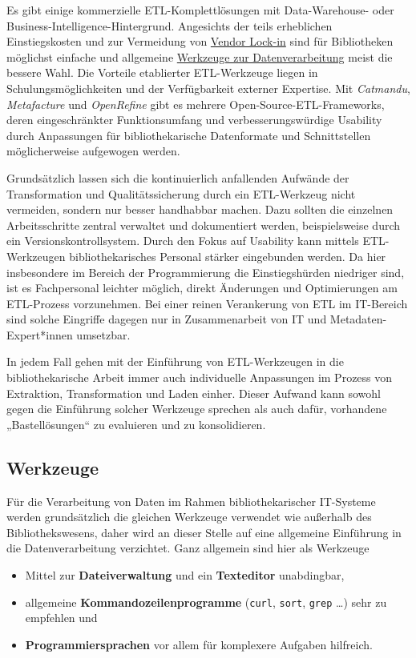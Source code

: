 \documentclass[
  11pt,
  letterpaper,
  DIV=11,
  twoside]{scrreprt}
\begin{document}
Es gibt einige kommerzielle ETL-Komplettlösungen mit Data-Warehouse-
oder Business-Intelligence-Hintergrund. Angesichts der teils erheblichen
Einstiegskosten und zur Vermeidung von \hyperref[vendor-lock-in]{Vendor
Lock-in} sind für Bibliotheken möglichst einfache und allgemeine
\hyperref[werkzeuge]{Werkzeuge zur Datenverarbeitung} meist die bessere
Wahl. Die Vorteile etablierter ETL-Werkzeuge liegen in
Schulungsmöglichkeiten und der Verfügbarkeit externer Expertise. Mit
\emph{Catmandu}, \emph{Metafacture} und \emph{OpenRefine} gibt es
mehrere Open-Source-ETL-Frameworks, deren eingeschränkter
Funktionsumfang und verbesserungswürdige Usability durch Anpassungen für
bibliothekarische Datenformate und Schnittstellen möglicherweise
aufgewogen werden.

Grundsätzlich lassen sich die kontinuierlich anfallenden Aufwände der
Transformation und Qualitätssicherung durch ein ETL-Werkzeug nicht
vermeiden, sondern nur besser handhabbar machen. Dazu sollten die
einzelnen Arbeitsschritte zentral verwaltet und dokumentiert werden,
beispielsweise durch ein Versionskontrollsystem. Durch den Fokus auf
Usability kann mittels ETL-Werkzeugen bibliothekarisches Personal
stärker eingebunden werden. Da hier insbesondere im Bereich der
Programmierung die Einstiegshürden niedriger sind, ist es Fachpersonal
leichter möglich, direkt Änderungen und Optimierungen am ETL-Prozess
vorzunehmen. Bei einer reinen Verankerung von ETL im IT-Bereich sind
solche Eingriffe dagegen nur in Zusammenarbeit von IT und
Metadaten-Expert*innen umsetzbar.

In jedem Fall gehen mit der Einführung von ETL-Werkzeugen in die
bibliothekarische Arbeit immer auch individuelle Anpassungen im Prozess
von Extraktion, Transformation und Laden einher. Dieser Aufwand kann
sowohl gegen die Einführung solcher Werkzeuge sprechen als auch dafür,
vorhandene „Bastellösungen`` zu evaluieren und zu konsolidieren.

\subsection{Werkzeuge}\label{werkzeuge}

Für die Verarbeitung von Daten im Rahmen bibliothekarischer IT-Systeme
werden grundsätzlich die gleichen Werkzeuge verwendet wie außerhalb des
Bibliothekswesens, daher wird an dieser Stelle auf eine allgemeine
Einführung in die Datenverarbeitung verzichtet. Ganz allgemein sind hier
als Werkzeuge

\begin{itemize}
\item
  Mittel zur \textbf{Dateiverwaltung} und ein \textbf{Texteditor}
  unabdingbar,
\item
  allgemeine \textbf{Kommandozeilenprogramme} (\texttt{curl},
  \texttt{sort}, \texttt{grep} \ldots) sehr zu empfehlen und
\item
  \textbf{Programmiersprachen} vor allem für komplexere Aufgaben
  hilfreich.
\end{itemize}
\end{document}
